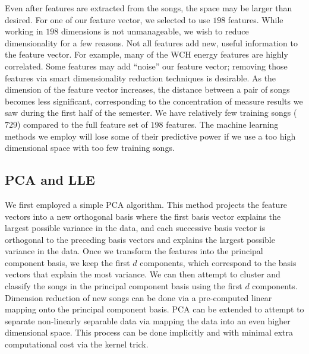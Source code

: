 \documentclass[12pt]{article}
\begin{document}
Even after features are extracted from the songs, the space may be larger than desired.  For one of our feature vector, we selected to use $198$ features.  While working in $198$ dimensions is not unmanageable, we wish to reduce dimensionality for a few reasons.  Not all features add new, useful information to the feature vector.  For example, many of the WCH energy features are highly correlated.  Some features may add ``noise'' our feature vector; removing those features via smart dimensionality reduction techniques is desirable.  As the dimension of the feature vector increases, the distance between a pair of songs becomes less significant, corresponding to the concentration of measure results we saw during the first half of the semester.  We have relatively few training songs ($729$) compared to the full feature set of $198$ features.  The machine learning methods we employ will lose some of their predictive power if we use a too high dimensional space with too few training songs.\\

\subsection*{PCA and LLE}
We first employed a simple PCA algorithm.  This method projects the feature vectors into a new orthogonal basis where the first basis vector explains the largest possible variance in the data, and each successive basis vector is orthogonal to the preceding basis vectors and explains the largest possible variance in the data.  Once we transform the features into the principal component basis, we keep the first $d$ components, which correspond to the basis vectors that explain the most variance.  We can then attempt to cluster and classify the songs in the principal component basis using the first $d$ components.  Dimension reduction of new songs can be done via a pre-computed linear mapping onto the principal component basis.  PCA can be extended to attempt to separate non-linearly separable data via mapping the data into an even higher dimensional space.  This process can be done implicitly and with minimal extra computational cost via the kernel trick.\\

\end{document}
